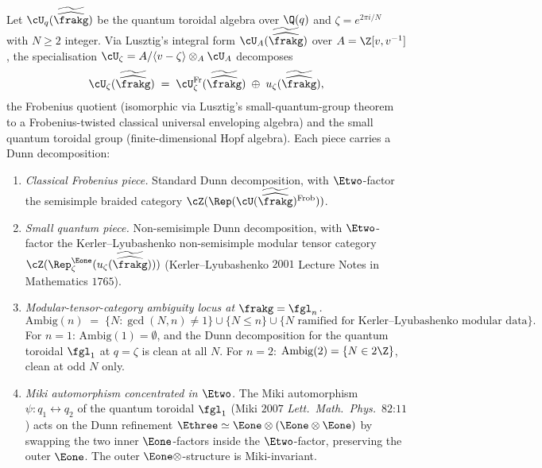 \begin{theorem}[Root-of-unity Dunn at \texorpdfstring{$q = e^{2\pi i/N}$}{q = exp(2 pi i / N)}]
\label{thm:root-of-unity-dunn-toroidal}
Let $\cU_q(\widetilde{\widehat\frakg})$ be the quantum toroidal algebra over $\Q(q)$ and $\zeta = e^{2\pi i/N}$ with $N \geq 2$ integer. Via Lusztig's integral form $\cU_A(\widetilde{\widehat\frakg})$ over $A = \Z[v, v^{-1}]$, the specialisation $\cU_\zeta = A/\langle v - \zeta\rangle \otimes_A \cU_A$ decomposes
\[
 \cU_\zeta(\widetilde{\widehat\frakg}) \;=\; \cU_\zeta^{\mathrm{Fr}}(\widetilde{\widehat\frakg}) \;\oplus\; u_\zeta(\widetilde{\widehat\frakg}),
\]
the Frobenius quotient (isomorphic via Lusztig's small-quantum-group theorem to a Frobenius-twisted classical universal enveloping algebra) and the small quantum toroidal group (finite-dimensional Hopf algebra). Each piece carries a Dunn decomposition:
\begin{enumerate}[label=(\roman*)]
\item \emph{Classical Frobenius piece.} Standard Dunn decomposition, with $\Etwo$-factor the semisimple braided category $\cZ(\Rep(\cU(\widetilde{\widehat\frakg})^{\mathrm{Frob}}))$.
\item \emph{Small quantum piece.} Non-semisimple Dunn decomposition, with $\Etwo$-factor the Kerler--Lyubashenko non-semisimple modular tensor category $\cZ(\Rep_\zeta^{\Eone}(u_\zeta(\widetilde{\widehat\frakg})))$ (Kerler--Lyubashenko $2001$ Lecture Notes in Mathematics $1765$).
\item \emph{Modular-tensor-category ambiguity locus at \texorpdfstring{$\frakg = \fgl_n$}{g = gl-n}.}
\[
 \mathrm{Ambig}(n) \;=\; \bigl\{N : \gcd(N, n) \neq 1\bigr\} \cup \bigl\{N \leq n\bigr\} \cup \bigl\{N \text{ ramified for Kerler--Lyubashenko modular data}\bigr\}.
\]
For $n = 1$: $\mathrm{Ambig}(1) = \emptyset$, and the Dunn decomposition for the quantum toroidal $\fgl_1$ at $q = \zeta$ is clean at all $N$. For $n = 2$: $\mathrm{Ambig}(2) = \{N \in 2\Z\}$, clean at odd $N$ only.
\item \emph{Miki automorphism concentrated in $\Etwo$.} The Miki automorphism $\psi \colon q_1 \leftrightarrow q_2$ of the quantum toroidal $\fgl_1$ (Miki $2007$ \emph{Lett.~Math.~Phys.}~$82$:$11$) acts on the Dunn refinement $\Ethree \simeq \Eone \otimes (\Eone \otimes \Eone)$ by swapping the two inner $\Eone$-factors inside the $\Etwo$-factor, preserving the outer $\Eone$. The outer $\Eone \otimes$-structure is Miki-invariant.
\end{enumerate}
\end{theorem}

